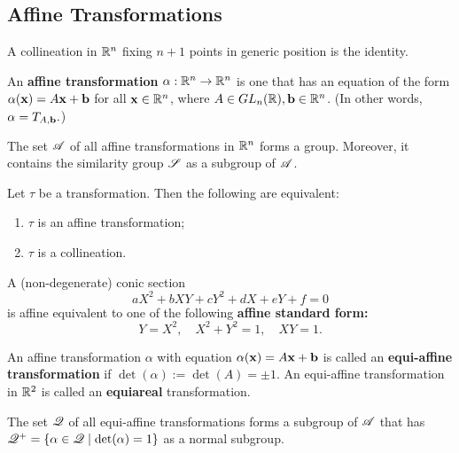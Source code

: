 \subsection{Affine Transformations}

\begin{theorem}
    A collineation in \(\mathbb{R}^n\) fixing \(n + 1\) points in generic position is the identity.
\end{theorem}

\begin{definition}
    An \textbf{affine transformation} \(\alpha : \mathbb{R}^n \to \mathbb{R}^n\) is one that has an equation of the form \(\alpha(\mathbf{x}) = A\mathbf{x} + \mathbf{b}\) for all \(\mathbf{x} \in \mathbb{R}^n\), where \(A \in GL_n(\mathbb{R}), \mathbf{b} \in \mathbb{R}^n\). (In other words, \(\alpha = T_{A, \mathbf{b}}.\))
\end{definition}

\begin{lemma}
    The set \(\mathscr{A}\) of all affine transformations in \(\mathbb{R}^n\) forms a group. Moreover, it contains the similarity group \(\mathscr{S}\) as a subgroup of \(\mathscr{A}\).
\end{lemma}

\begin{theorem}
    Let \(\tau\) be a transformation. Then the following are equivalent:
    \begin{enumerate}
        \item \(\tau\) is an affine transformation;
        \item \(\tau\) is a collineation.
    \end{enumerate}
\end{theorem}

\begin{proposition}
    A (non-degenerate) conic section
    \[aX^2 + bXY + cY^2 +dX + eY + f = 0\]
    is affine equivalent to one of the following \textbf{affine standard form:}
    \[Y = X^2, \quad X^2 + Y^2 = 1, \quad XY = 1.\]
\end{proposition}

\begin{definition}
    An affine transformation \(\alpha\) with equation \(\alpha(\mathbf{x}) = A\mathbf{x} + \mathbf{b}\) is called an \textbf{equi-affine transformation} if \(\det(\alpha) := \det(A) = \pm 1\). An equi-affine transformation in \(\mathbb{R}^2\) is called an \textbf{equiareal} transformation.
\end{definition}

\begin{proposition}
    The set \(\mathscr{Q}\) of all equi-affine transformations forms a subgroup of \(\mathscr{A}\) that has \(\mathscr{Q}^+ = \{\alpha \in \mathscr{Q} \mid \det(\alpha) = 1 \}\) as a normal subgroup.
\end{proposition}


